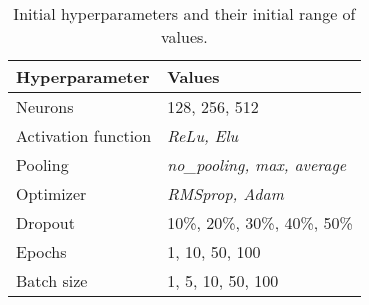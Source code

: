 \begin{table}[b]
    \centering
    \begin{tabular}{|l|l|}
    \hline
    \textbf{Hyperparameter} & \textbf{Values}                    \\ \hline\hline
    Neurons                 & 128, 256, 512                      \\ \hline
    Activation function     & \textit{ReLu, Elu}                 \\ \hline 
    Pooling                 & \textit{no\_pooling, max, average} \\ \hline
    Optimizer               & \textit{RMSprop, Adam}             \\ \hline
    Dropout                 & 10\%, 20\%, 30\%, 40\%, 50\%       \\ \hline
    Epochs                  & 1, 10, 50, 100                     \\ \hline
    Batch size              & 1, 5, 10, 50, 100                  \\ \hline
    \end{tabular}
    \caption{Initial hyperparameters and their initial range of values.}
    \label{tab:init_params}
\end{table}